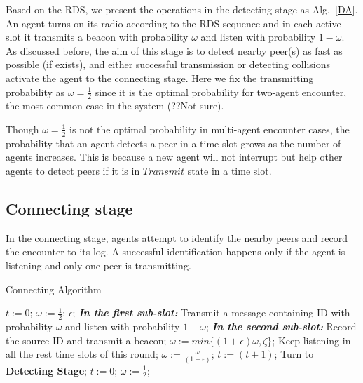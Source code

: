 Based on the RDS, we present the operations in the detecting stage as Alg.~\ref{DA}.
An agent turns on its radio according to the RDS sequence and in each active slot it
transmits a beacon with probability $\omega$ and listen with probability $1-\omega$.
As discussed before, the aim of this stage is to detect nearby peer(s) as fast as possible 
(if exists), and either successful transmission or detecting collisions activate the agent
to the connecting stage. Here we fix the transmitting probability as $\omega = \frac{1}{2}$ 
since it is the optimal probability for two-agent encounter, the most common case
in the {\sysname} system (??Not sure). 
\begin{remark}
    Though $\omega = \frac{1}{2}$ is not the optimal probability in multi-agent encounter cases, 
    the probability that an agent detects a peer in a time slot grows as the number of agents
    increases. This is because a new agent will not interrupt but help other agents to detect peers
    if it is in $Transmit$ state in a time slot.
\end{remark}

\subsection{Connecting stage}

In the connecting stage, agents attempt to identify the nearby 
peers and record the encounter to its log.
A successful identification happens only if the agent is listening
and only one peer is transmitting. 

\begin{algorithm}[!h]
    \caption{Connecting Algorithm}
    \label{CA}
    \begin{algorithmic}[1]
    \STATE $t := 0$; $\omega := \frac{1}{2}$; $\epsilon$;
        \STATE \textbf{\emph{In the first sub-slot:}}
        \STATE Transmit a message containing ID with probability $\omega$
        and listen with probability $1-\omega$;
        \STATE \textbf{\emph{In the second sub-slot:}}
                \STATE Record the source ID and transmit a beacon;
                \STATE $\omega := min\{(1+\epsilon)\omega, \zeta\}$;
            \ENDIF
        \ELSE
                \STATE Keep listening in all the rest time slots of this round;
            \ELSE
                \STATE $\omega := \frac{\omega}{(1+\epsilon)}$;
            \ENDIF
        \ENDIF
        \STATE $t := (t + 1)$;
                \STATE Turn to \textbf{Detecting Stage};
            \ELSE
                \STATE $t := 0$; $\omega := \frac{1}{2}$;
            \ENDIF
        \ENDIF
    \ENDWHILE
    \end{algorithmic}
\end{algorithm}



